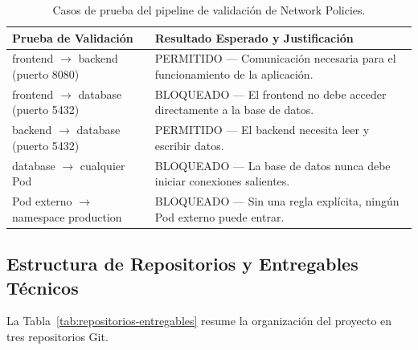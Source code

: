 \begin{table}[htbp]
\centering
\scriptsize
\renewcommand{\arraystretch}{1.25}
\setlength{\tabcolsep}{4pt}
\caption{Casos de prueba del pipeline de validación de Network Policies.}
\label{tab:validacion-network-policies}
\begin{tabularx}{\textwidth}{|p{5cm}|Y|}
\hline
\textbf{Prueba de Validación} & \textbf{Resultado Esperado y Justificación} \\
\hline
frontend $\rightarrow$ backend (puerto 8080) & PERMITIDO --- Comunicación necesaria para el funcionamiento de la aplicación. \\
\hline
frontend $\rightarrow$ database (puerto 5432) & BLOQUEADO --- El frontend no debe acceder directamente a la base de datos. \\
\hline
backend $\rightarrow$ database (puerto 5432) & PERMITIDO --- El backend necesita leer y escribir datos. \\
\hline
database $\rightarrow$ cualquier Pod & BLOQUEADO --- La base de datos nunca debe iniciar conexiones salientes. \\
\hline
Pod externo $\rightarrow$ namespace production & BLOQUEADO --- Sin una regla explícita, ningún Pod externo puede entrar. \\
\hline
\end{tabularx}
\end{table}

\subsection{Estructura de Repositorios y Entregables Técnicos}

La Tabla~\ref{tab:repositorios-entregables} resume la organización del proyecto en tres repositorios Git.

